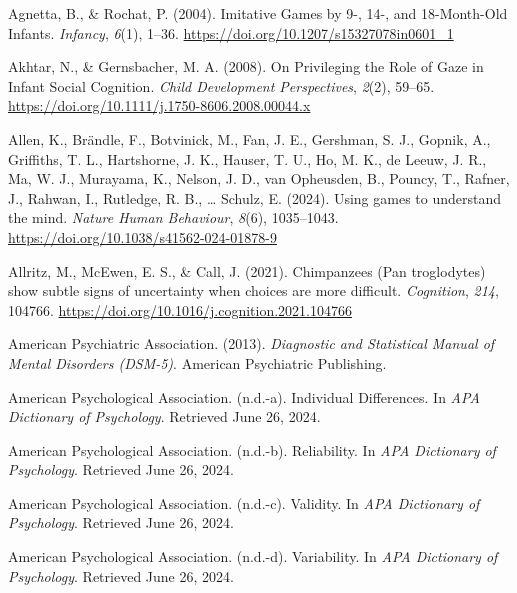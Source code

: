 \documentclass[
]{scrbook}
\newlength{\cslhangindent}
\newenvironment{CSLReferences}[2] %
 {\begin{list}{}{%
  \setlength{\itemindent}{0pt}
  \setlength{\leftmargin}{0pt}
  \setlength{\parsep}{0pt}
  \ifodd #1
   \setlength{\leftmargin}{\cslhangindent}
   \setlength{\itemindent}{-1\cslhangindent}
  \fi
  \setlength{\itemsep}{#2\baselineskip}}}
 {\end{list}}
\begin{document}
\label{refs}
\begin{CSLReferences}{1}{0}
Agnetta, B., \& Rochat, P. (2004). Imitative {Games} by 9-, 14-, and 18-{Month-Old Infants}. \emph{Infancy}, \emph{6}(1), 1--36. \url{https://doi.org/10.1207/s15327078in0601_1}

Akhtar, N., \& Gernsbacher, M. A. (2008). On {Privileging} the {Role} of {Gaze} in {Infant Social Cognition}. \emph{Child Development Perspectives}, \emph{2}(2), 59--65. \url{https://doi.org/10.1111/j.1750-8606.2008.00044.x}

Allen, K., Brändle, F., Botvinick, M., Fan, J. E., Gershman, S. J., Gopnik, A., Griffiths, T. L., Hartshorne, J. K., Hauser, T. U., Ho, M. K., de Leeuw, J. R., Ma, W. J., Murayama, K., Nelson, J. D., van Opheusden, B., Pouncy, T., Rafner, J., Rahwan, I., Rutledge, R. B., \ldots{} Schulz, E. (2024). Using games to understand the mind. \emph{Nature Human Behaviour}, \emph{8}(6), 1035--1043. \url{https://doi.org/10.1038/s41562-024-01878-9}

Allritz, M., McEwen, E. S., \& Call, J. (2021). Chimpanzees ({Pan} troglodytes) show subtle signs of uncertainty when choices are more difficult. \emph{Cognition}, \emph{214}, 104766. \url{https://doi.org/10.1016/j.cognition.2021.104766}

American Psychiatric Association. (2013). \emph{Diagnostic and {Statistical Manual} of {Mental Disorders} ({DSM}-5)}. American Psychiatric Publishing.

American Psychological Association. (n.d.-a). Individual {Differences}. In \emph{APA Dictionary of Psychology}. Retrieved June 26, 2024.

American Psychological Association. (n.d.-b). Reliability. In \emph{APA Dictionary of Psychology}. Retrieved June 26, 2024.

American Psychological Association. (n.d.-c). Validity. In \emph{APA Dictionary of Psychology}. Retrieved June 26, 2024.

American Psychological Association. (n.d.-d). Variability. In \emph{APA Dictionary of Psychology}. Retrieved June 26, 2024.


\end{CSLReferences}
\end{document}
